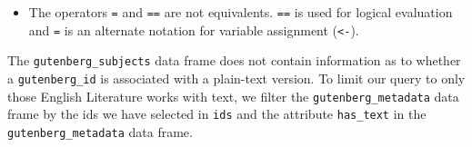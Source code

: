 \documentclass[
]{article}
\newenvironment{Shaded}{\begin{snugshade}}{\end{snugshade}}
\newcommand{\CommentTok}[1]{\textcolor[rgb]{0.56,0.35,0.01}{\textit{#1}}}
\newcommand{\FunctionTok}[1]{\textcolor[rgb]{0.00,0.00,0.00}{#1}}
\newcommand{\NormalTok}[1]{#1}
\newcommand{\OtherTok}[1]{\textcolor[rgb]{0.56,0.35,0.01}{#1}}
\newcommand{\SpecialCharTok}[1]{\textcolor[rgb]{0.00,0.00,0.00}{#1}}
\newcommand{\StringTok}[1]{\textcolor[rgb]{0.31,0.60,0.02}{#1}}
\newenvironment{rmdblock}[1]
  {\begin{shaded*}
  \begin{itemize}
  \renewcommand{\labelitemi}{
    \raisebox{-.5\height}[0pt][0pt]{
      {\setkeys{Gin}{width=2em,keepaspectratio}\texttt{[image: assets/images/\#1]}}
    }
  }
  \item
  }
  {
  \end{itemize}
  \end{shaded*}
  }
\newenvironment{rmdwarning}
  {\begin{rmdblock}{warning}}
  {\end{rmdblock}}
\begin{document}
\begin{Shaded}
\end{Shaded}

\begin{rmdwarning}
The operators \texttt{=} and \texttt{==} are not equivalents.
\texttt{==} is used for logical evaluation and \texttt{=} is an
alternate notation for variable assignment (\texttt{\textless{}-}).
\end{rmdwarning}

The \texttt{gutenberg\_subjects} data frame does not contain information as to whether a \texttt{gutenberg\_id} is associated with a plain-text version. To limit our query to only those English Literature works with text, we filter the \texttt{gutenberg\_metadata} data frame by the ids we have selected in \texttt{ids} and the attribute \texttt{has\_text} in the \texttt{gutenberg\_metadata} data frame.
\end{document}
